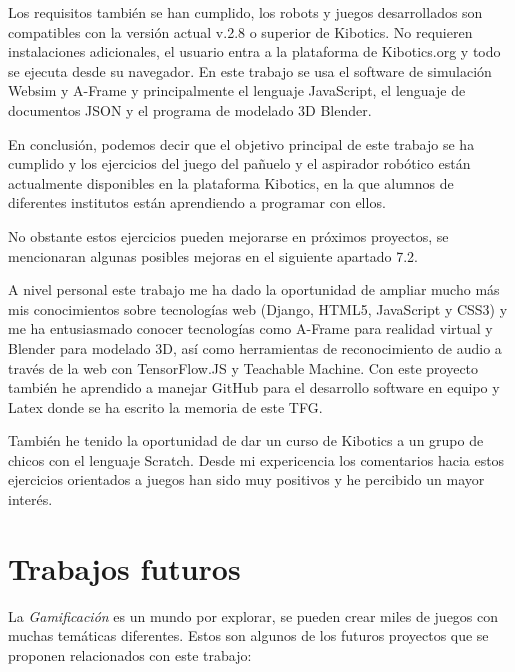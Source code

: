 Los requisitos  también se han cumplido, los robots y juegos desarrollados son compatibles con la versión actual v.2.8 o superior de Kibotics. No requieren instalaciones adicionales, el usuario entra a la plataforma de Kibotics.org y todo se ejecuta desde su navegador.  En este trabajo se usa el software de simulación Websim y A-Frame y principalmente el lenguaje JavaScript, el lenguaje de documentos JSON y el programa de modelado 3D Blender.

En conclusión,  podemos decir que el objetivo principal de este trabajo se ha cumplido y los ejercicios del juego del pañuelo y el aspirador robótico están actualmente disponibles en la plataforma Kibotics, en la que alumnos de diferentes institutos están aprendiendo a programar con ellos.

No obstante estos ejercicios pueden mejorarse en próximos proyectos, se mencionaran algunas posibles mejoras en el siguiente apartado 7.2.

A nivel personal este trabajo me ha dado la oportunidad de ampliar mucho más mis conocimientos sobre tecnologías web (Django, HTML5, JavaScript y CSS3) y me ha entusiasmado conocer tecnologías como A-Frame para realidad virtual y Blender para modelado 3D, así como herramientas de reconocimiento de audio a través de la web con TensorFlow.JS y Teachable Machine.
Con este proyecto también he aprendido a manejar GitHub para el desarrollo software en equipo y Latex donde se ha escrito la memoria de este TFG.

También he tenido la oportunidad de dar un curso de Kibotics a un grupo de chicos con el lenguaje Scratch. Desde mi expericencia los comentarios hacia estos ejercicios orientados a juegos han sido muy positivos y he percibido un mayor interés.

    
\section{Trabajos futuros}

La \textit{Gamificación} es un mundo por explorar, se pueden crear miles de juegos con muchas temáticas diferentes. Estos son algunos de los futuros proyectos que se proponen relacionados con este trabajo:


